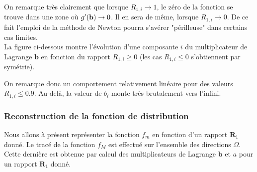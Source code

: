 On remarque très clairement que lorsque  $R_{1,i} \rightarrow 1$, le zéro de la fonction se trouve dans une zone où $g'(\mathbf{b}) \rightarrow 0$. Il en sera de même, lorsque  $R_{1,i} \rightarrow 0$. De ce fait l'emploi de la méthode de Newton pourra s'avérer "périlleuse" dans certains cas limites.\\
\newline
La figure ci-dessous montre l'évolution d'une composante $i$ du multiplicateur de Lagrange $\mathbf{b}$ en fonction du rapport $R_{1,i} \geq 0$ (les cas $R_{1,i} \leq 0$ s'obtiennent par symétrie).

\begin{center}
\end{center}
 
On remarque donc un comportement relativement linéaire pour des valeurs $R_{1,i} \leq 0.9$. Au-delà, la valeur de $b_i$ monte très brutalement vers l'infini.


\subsubsection{Reconstruction de la fonction de distribution}

Nous allons à présent représenter la fonction $f_m$ en fonction d'un rapport $\mathbf{R}_1$ donné. Le tracé de la fonction $f_M$ est effectué sur l'ensemble des directions $\Omega$. Cette dernière est obtenue par calcul des multiplicateurs de Lagrange $\mathbf{b}$ et $a$ pour un rapport $\mathbf{R}_1$ donné.
\newline

